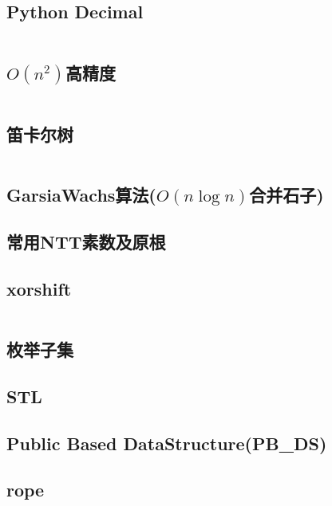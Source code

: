 \documentclass[a4paper, twoside]{article}
\begin{document}
\begin{multicols}{2}
			\subsection{Python Decimal}
				\inputminted{python}{../src/misc/decimal.py}
			
			\subsection{$O(n^2)$高精度}
				\inputminted{cpp}{../src/misc/高精度.cpp}
			
			\subsection{笛卡尔树}
				\inputminted{cpp}{../src/misc/笛卡尔树.cpp}
			
			\subsection{GarsiaWachs算法($O(n\log n)$合并石子)}
				
			
			\subsection{常用NTT素数及原根}
				

			\subsection{xorshift}
				\inputminted{cpp}{../src/misc/xorshift.cpp}
			
			\subsection{枚举子集}
				
				
			\subsection{STL}
				

			\subsection{Public Based DataStructure(PB\_DS)}
				\label{pbds}
				

			\subsection{rope}
				\inputminted{cpp}{../src/misc/rope.cpp}
			

\end{multicols}
\end{document}
